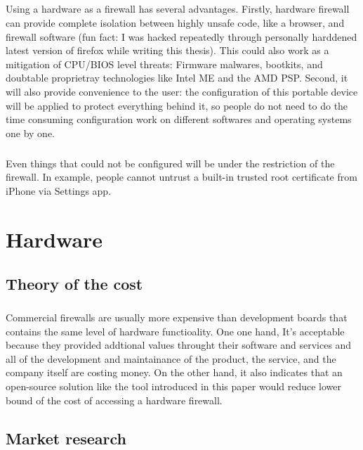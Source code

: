 \documentclass[mscthesis]{usiinfthesis}
\begin{document}
\paragraph{}
Using a hardware as a firewall has several advantages. Firstly, hardware
firewall can provide complete isolation between highly unsafe code,
like a browser, and firewall software (fun fact: I was hacked repeatedly
through personally harddened latest version of firefox while writing this
thesis). This could also work as a mitigation of CPU/BIOS level threats:
Firmware malwares, bootkits, and doubtable proprietray technologies like
Intel ME and the AMD PSP. Second, it will also provide convenience to the
user: the configuration of this portable device will be applied to protect
everything behind it, so people do not need to do the time consuming
configuration work on different softwares and operating systems one by one.
\paragraph{}
Even things that could not be configured will be under the restriction of the firewall. In example, people cannot untrust a built-in trusted root certificate from iPhone via Settings app.

\chapter{Hardware}
\section{Theory of the cost}
\paragraph{}
Commercial firewalls are usually more expensive than development boards that contains the same level of hardware functioality. One one hand, It's acceptable because they provided addtional values throught their software and services and all of the development and maintainance of the product, the service, and the company itself are costing money. On the other hand, it also indicates that an open-source solution like the tool introduced in this paper would reduce lower bound of the cost of accessing a hardware firewall.
\section{Market research}
\end{document}
